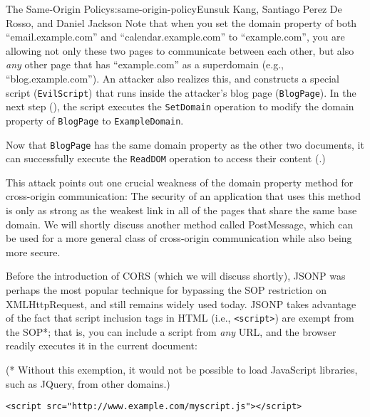 \begin{aosachapter}{The Same-Origin Policy}{s:same-origin-policy}{Eunsuk Kang, Santiago Perez De Rosso, and Daniel Jackson}
Note that when you set the domain property of both ``email.example.com''
and ``calendar.example.com'' to ``example.com'', you are allowing not
only these two pages to communicate between each other, but also
\emph{any} other page that has ``example.com'' as a superdomain (e.g.,
``blog.example.com''). An attacker also realizes this, and constructs a
special script (\texttt{EvilScript}) that runs inside the attacker's
blog page (\texttt{BlogPage}). In the next step
(), the script
executes the \texttt{SetDomain} operation to modify the domain property
of \texttt{BlogPage} to \texttt{ExampleDomain}.


Now that \texttt{BlogPage} has the same domain property as the other two
documents, it can successfully execute the \texttt{ReadDOM} operation to
access their content
(.)


This attack points out one crucial weakness of the domain property
method for cross-origin communication: The security of an application
that uses this method is only as strong as the weakest link in all of
the pages that share the same base domain. We will shortly discuss
another method called PostMessage, which can be used for a more general
class of cross-origin communication while also being more secure.

\label{json-with-padding-jsonp}

Before the introduction of CORS (which we will discuss shortly), JSONP
was perhaps the most popular technique for bypassing the SOP restriction
on XMLHttpRequest, and still remains widely used today. JSONP takes
advantage of the fact that script inclusion tags in HTML (i.e.,
\texttt{\textless{}script\textgreater{}}) are exempt from the SOP*; that
is, you can include a script from \emph{any} URL, and the browser
readily executes it in the current document:

(* Without this exemption, it would not be possible to load JavaScript
libraries, such as JQuery, from other domains.)

\begin{verbatim}
<script src="http://www.example.com/myscript.js"></script>
\end{verbatim}


\end{aosachapter}
